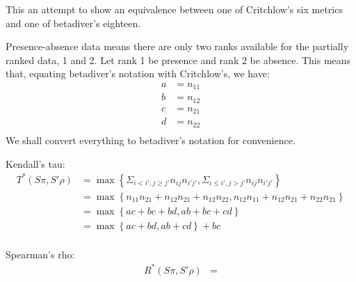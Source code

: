 \documentclass[a4paper,12pt]{article}
\begin{document}
This an attempt to show an equivalence between one of Critchlow's six metrics and one of betadiver's eighteen.

Presence-absence data means there are only two ranks available for the partially ranked data, 1 and 2.
Let rank 1 be presence and rank 2 be absence.
This means that, equating betadiver's notation with Critchlow's, we have:
\begin{align*}
	a &= n_{11}\\
	b &= n_{12}\\
	c &= n_{21}\\
	d &= n_{22}\\
\end{align*}
We shall convert everything to betadiver's notation for convenience.

Kendall's tau:
\begin{align*}
	T^*\left(S\pi, S'\rho\right)
	&= \max \left\{ \Sigma_{i < i',j \geq j'} n_{ij}n_{i'j'} , \Sigma_{i \leq i',j > j'} n_{ij}n_{i'j'} \right\}\\
	&= \max \left\{ n_{11}n_{21} + n_{12}n_{21} + n_{12}n_{22} , n_{12}n_{11} + n_{12}n_{21} + n_{22}n_{21} \right\}\\
	&= \max \left\{ ac + bc + bd , ab + bc + cd \right\}\\
	&= \max \left\{ ac + bd , ab + cd \right\} + bc\\
\end{align*}

Spearman's rho:
\begin{align*}
	R^*\left(S\pi, S'\rho\right)
	&= \\
\end{align*}
\end{document}
